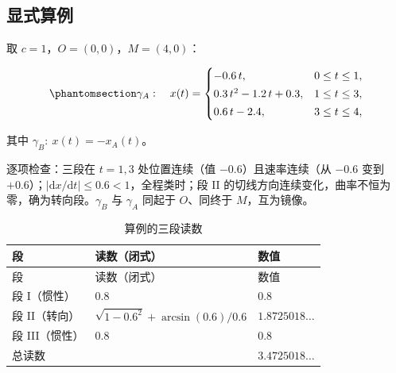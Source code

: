 \documentclass[
  chinese,
  a4paper,
  UTF8,
  12pt,
  oneside,
  openany]{ctexbook}
\theoremstyle{plain}
\theoremstyle{plain}
\theoremstyle{plain}
\theoremstyle{definition}
\theoremstyle{plain}
\theoremstyle{plain}
\theoremstyle{remark}
\begin{document}
\subsection{显式算例}\label{ux663eux5f0fux7b97ux4f8b}

取 \(c=1\)，\(O=(0,0)\)，\(M=(4,0)\)：

\begin{equation}\protect\phantomsection\label{eq-tn-example}{
\gamma_A:\quad
x(t)=\begin{cases}
-0.6\,t, & 0\le t\le 1,\\[2pt]
0.3\,t^{2}-1.2\,t+0.3, & 1\le t\le 3,\\[2pt]
0.6\,t-2.4, & 3\le t\le 4,
\end{cases}
}\end{equation}

其中 \(\gamma_B:\ x(t)=-x_A(t)\)。

逐项检查：三段在 \(t=1,3\) 处位置连续（值 \(-0.6\)）且速率连续（从
\(-0.6\) 变到
\(+0.6\)）；\(|\mathrm{d}x/\mathrm{d}t|\le 0.6<1\)，全程类时；段 II
的切线方向连续变化，曲率不恒为零，确为转向段。\(\gamma_B\) 与
\(\gamma_A\) 同起于 \(O\)、同终于 \(M\)，互为镜像。

\begin{longtable}[]{@{}
  >{\raggedright\arraybackslash}p{}
  >{\raggedright\arraybackslash}p{}
  >{\raggedright\arraybackslash}p{}@{}}
\caption{算例的三段读数}\label{tbl-tn-example}\tabularnewline
\toprule\noalign{}
\begin{minipage}[b]{\linewidth}\raggedright
段
\end{minipage} & \begin{minipage}[b]{\linewidth}\raggedright
读数（闭式）
\end{minipage} & \begin{minipage}[b]{\linewidth}\raggedright
数值
\end{minipage} \\
\midrule\noalign{}
\endfirsthead
\toprule\noalign{}
\begin{minipage}[b]{\linewidth}\raggedright
段
\end{minipage} & \begin{minipage}[b]{\linewidth}\raggedright
读数（闭式）
\end{minipage} & \begin{minipage}[b]{\linewidth}\raggedright
数值
\end{minipage} \\
\midrule\noalign{}
\endhead
\bottomrule\noalign{}
\endlastfoot
段 I（惯性） & \(0.8\) & \(0.8\) \\
段 II（转向） & \(\sqrt{1-0.6^{2}}+\arcsin(0.6)/0.6\) &
\(1.8725018\ldots\) \\
段 III（惯性） & \(0.8\) & \(0.8\) \\
总读数 & & \(3.4725018\ldots\) \\
\end{longtable}
\end{document}
